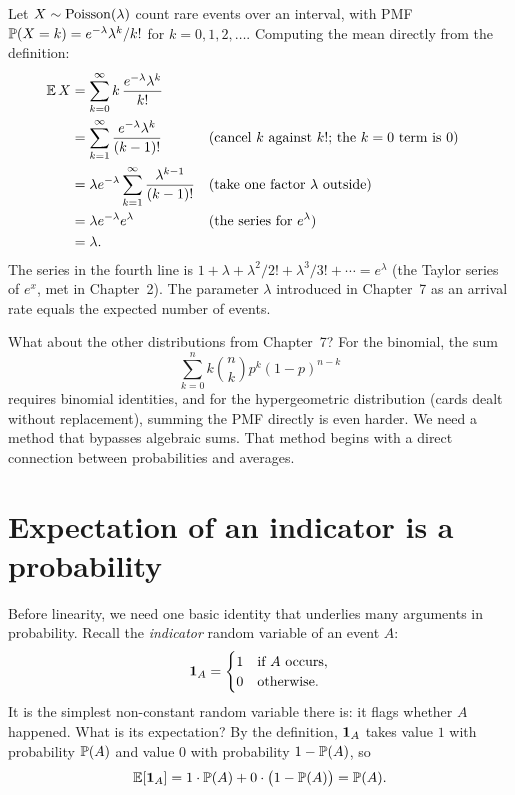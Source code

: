 \begin{example}
\label{ch08:ex-poisson-mean}
Let $X \sim \Pois(\lambda)$ count rare events over an interval, with PMF
$\P(X = k) = e^{-\lambda}\lambda^k / k!$ for $k = 0, 1, 2, \dots$.
Computing the mean directly from the definition:
\begin{align*}
  \E X &= \sum_{k=0}^\infty k\,\frac{e^{-\lambda}\lambda^k}{k!}\\
       &= \sum_{k=1}^\infty \frac{e^{-\lambda}\lambda^k}{(k-1)!}
          && \text{(cancel $k$ against $k!$; the $k=0$ term is $0$)}\\
       &= \lambda e^{-\lambda} \sum_{k=1}^\infty \frac{\lambda^{k-1}}{(k-1)!}
          && \text{(take one factor $\lambda$ outside)}\\
       &= \lambda e^{-\lambda} e^{\lambda}
          && \text{(the series for $e^{\lambda}$)}\\
       &= \lambda.
\end{align*}
The series in the fourth line is $1 + \lambda + \lambda^2/2! + \lambda^3/3! + \cdots =
e^{\lambda}$ (the Taylor series of $e^x$, met in Chapter~2).
The parameter $\lambda$ introduced in Chapter~7 as an arrival rate
equals the expected number of events.
\end{example}

What about the other distributions from Chapter~7? For the binomial,
the sum
\[
  \sum_{k=0}^n k \binom{n}{k} p^k (1-p)^{n-k}
\]
requires binomial identities, and for the hypergeometric distribution (cards dealt without replacement), summing
the PMF directly is even harder. We need a method that bypasses algebraic sums.
That method begins with a direct connection between probabilities and averages.

\section{Expectation of an indicator is a probability}
\label{ch08:indicators}

Before linearity, we need one basic identity that underlies many arguments
in probability. Recall the \emph{indicator} random variable of an event $A$:
\[
  \ind_A = \begin{cases} 1 & \text{if } A \text{ occurs},\\ 0 & \text{otherwise.}\end{cases}
\]
It is the simplest non-constant random variable there is: it flags whether
$A$ happened. What is its expectation? By the definition, $\ind_A$ takes value $1$
with probability $\P(A)$ and value $0$ with probability $1-\P(A)$, so
\[
  \E[\ind_A] = 1\cdot \P(A) + 0\cdot \bigl(1-\P(A)\bigr) = \P(A).
\]

